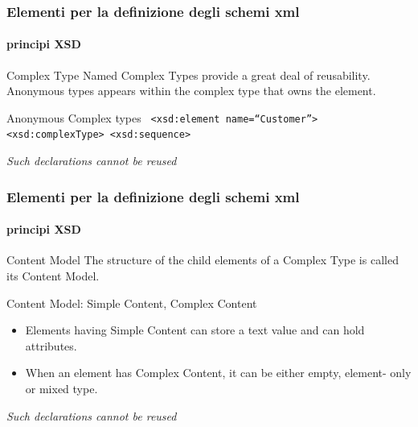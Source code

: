 \begin{frame}
	\frametitle{Elementi per la definizione degli schemi xml}
	\framesubtitle{principi XSD}
	\addtocounter{nframe}{1}

	\begin{block}{Complex Type}
		Named Complex Types provide a great deal of reusability.
 Anonymous types appears within the complex type that owns the element.

	\end{block}

	\begin{block}{Anonymous Complex types}
		\texttt{
			<xsd:element name=``Customer''>
			     <xsd:complexType>
			       <xsd:sequence>
		}
	\end{block}
	\textit{Such declarations cannot be reused}
\end{frame}


\begin{frame}
	\frametitle{Elementi per la definizione degli schemi xml}
	\framesubtitle{principi XSD}
	\addtocounter{nframe}{1}

	\begin{block}{Content Model}
		The structure of the child elements of a Complex Type is called its Content Model.
	\end{block}

	\begin{block}{Content Model: Simple Content, Complex Content}
		\begin{itemize}
			\item Elements having Simple Content can store a text value and can hold attributes.
			\item When an element has Complex Content, it can be either empty, element- only or mixed type.
		\end{itemize}
	\end{block}
	\textit{Such declarations cannot be reused}
\end{frame}

